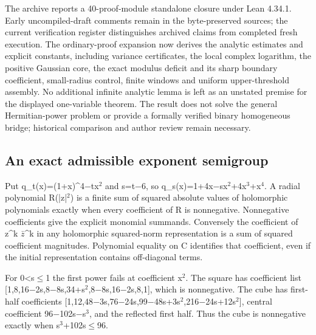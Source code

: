 \documentclass[11pt,a4paper]{article}
\begin{document}
The archive reports a 40-proof-module standalone closure under Lean 4.34.1. Early uncompiled-draft comments remain in the byte-preserved sources; the current verification register distinguishes archived claims from completed fresh execution. The ordinary-proof expansion now derives the analytic estimates and explicit constants, including variance certificates, the local complex logarithm, the positive Gaussian core, the exact modulus deficit and its sharp boundary coefficient, small-radius control, finite windows and uniform upper-threshold assembly. No additional infinite analytic lemma is left as an unstated premise for the displayed one-variable theorem. The result does not solve the general Hermitian-power problem or provide a formally verified binary homogeneous bridge; historical comparison and author review remain necessary.

\subsection{An exact admissible exponent semigroup}
Put q\_t(x)=(1+x)\textasciicircum{}4\ensuremath{-}tx\ensuremath{^2} and s=t\ensuremath{-}6, so q\_s(x)=1+4x\ensuremath{-}sx\ensuremath{^2}+4x\ensuremath{^3}+x\ensuremath{^4}. A radial polynomial R(|z|\ensuremath{^2}) is a finite sum of squared absolute values of holomorphic polynomials exactly when every coefficient of R is nonnegative. Nonnegative coefficients give the explicit monomial summands. Conversely the coefficient of z\textasciicircum{}k \ensuremath{\bar{z}}\textasciicircum{}k in any holomorphic squared-norm representation is a sum of squared coefficient magnitudes. Polynomial equality on C identifies that coefficient, even if the initial representation contains off-diagonal terms.

For 0<s\ensuremath{\leq}1 the first power fails at coefficient x\ensuremath{^2}. The square has coefficient list [1,8,16\ensuremath{-}2s,8\ensuremath{-}8s,34+s\ensuremath{^2},8\ensuremath{-}8s,16\ensuremath{-}2s,8,1], which is nonnegative. The cube has first-half coefficients [1,12,48\ensuremath{-}3s,76\ensuremath{-}24s,99\ensuremath{-}48s+3s\ensuremath{^2},216\ensuremath{-}24s+12s\ensuremath{^2}], central coefficient 96\ensuremath{-}102s\ensuremath{-}s\ensuremath{^3}, and the reflected first half. Thus the cube is nonnegative exactly when s\ensuremath{^3}+102s\ensuremath{\leq}96.
\end{document}
